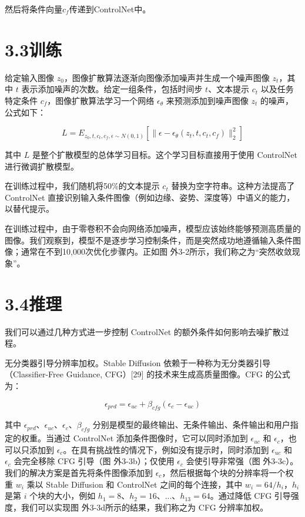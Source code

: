 \documentclass[a4paper,AutoFakeBold,oneside,12pt]{book}
\begin{document}
\begin{nopagenumber}
然后将条件向量$c_{f}$传递到ControlNet中。

\section*{3.3\quad{}训练}
给定输入图像 \(z_0\)，图像扩散算法逐渐向图像添加噪声并生成一个噪声图像 \(z_t\)，其中 \(t\) 表示添加噪声的次数。给定一组条件，包括时间步 \(t\)、文本提示 \(c_t\) 以及任务特定条件 \(c_f\)，图像扩散算法学习一个网络 \(\epsilon_\theta\) 来预测添加到噪声图像 \(z_t\) 的噪声，公式如下：

\[ L = E_{z_0,t,c_t,c_f,\epsilon \sim N(0,1)} \left[ \|\epsilon - \epsilon_\theta(z_t, t, c_t, c_f)\|^2_2 \right] \]

其中 \(L\) 是整个扩散模型的总体学习目标。这个学习目标直接用于使用 ControlNet 进行微调扩散模型。

在训练过程中，我们随机将50\%的文本提示 \(c_t\) 替换为空字符串。这种方法提高了 ControlNet 直接识别输入条件图像（例如边缘、姿势、深度等）中语义的能力，以替代提示。

在训练过程中，由于零卷积不会向网络添加噪声，模型应该始终能够预测高质量的图像。我们观察到，模型不是逐步学习控制条件，而是突然成功地遵循输入条件图像；通常在不到10,000次优化步骤内。正如图 外3-2所示，我们称之为“突然收敛现象”。

\section*{3.4\quad{}推理}

我们可以通过几种方式进一步控制 ControlNet 的额外条件如何影响去噪扩散过程。

无分类器引导分辨率加权。Stable Diffusion 依赖于一种称为无分类器引导（Classifier-Free Guidance, CFG）[29] 的技术来生成高质量图像。CFG 的公式为：

\[ \epsilon_{prd} = \epsilon_{uc} + \beta_{cfg} (\epsilon_c - \epsilon_{uc}) \]

其中 \(\epsilon_{prd}\)、\(\epsilon_{uc}\)、\(\epsilon_c\)、\(\beta_{cfg}\) 分别是模型的最终输出、无条件输出、条件输出和用户指定的权重。当通过 ControlNet 添加条件图像时，它可以同时添加到 \(\epsilon_{uc}\) 和 \(\epsilon_c\)，也可以只添加到 \(\epsilon_c\)。在具有挑战性的情况下，例如没有提示时，同时添加到 \(\epsilon_{uc}\) 和 \(\epsilon_c\) 会完全移除 CFG 引导（图 外3-3b）；仅使用 \(\epsilon_c\) 会使引导非常强（图 外3-3c）。我们的解决方案是首先将条件图像添加到 \(\epsilon_c\)，然后根据每个块的分辨率将一个权重 \(w_i\) 乘以 Stable Diffusion 和 ControlNet 之间的每个连接，其中 \(w_i = 64/h_i\)，\(h_i\) 是第 \(i\) 个块的大小，例如 \(h_1 = 8\)、\(h_2 = 16\)、...、\(h_{13} = 64\)。通过降低 CFG 引导强度，我们可以实现图 外3-3d所示的结果，我们称之为 CFG 分辨率加权。


\end{nopagenumber}
\end{document}
